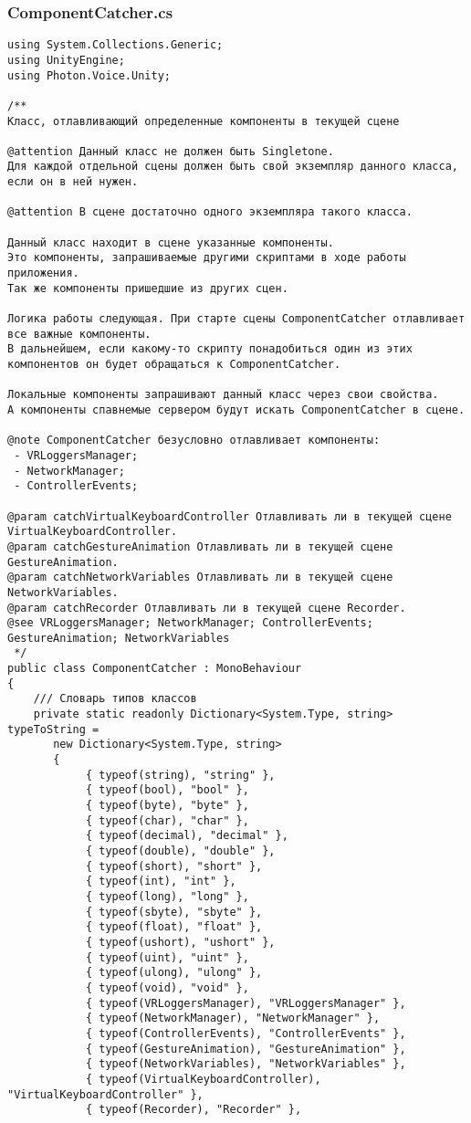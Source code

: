 \subsubsection*{ComponentCatcher.cs}
\begin{verbatim}
﻿using System.Collections.Generic;
using UnityEngine;
using Photon.Voice.Unity;

/**
Класс, отлавливающий определенные компоненты в текущей сцене

@attention Данный класс не должен быть Singletone. 
Для каждой отдельной сцены должен быть свой экземпляр данного класса, если он в ней нужен.

@attention В сцене достаточно одного экземпляра такого класса.

Данный класс находит в сцене указанные компоненты. 
Это компоненты, запрашиваемые другими скриптами в ходе работы приложения. 
Так же компоненты пришедшие из других сцен.

Логика работы следующая. При старте сцены ComponentCatcher отлавливает все важные компоненты. 
В дальнейшем, если какому-то скрипту понадобиться один из этих компонентов он будет обращаться к ComponentCatcher.

Локальные компоненты запрашивают данный класс через свои свойства. 
А компоненты спавнемые сервером будут искать ComponentCatcher в сцене.

@note ComponentCatcher безусловно отлавливает компоненты:
 - VRLoggersManager;
 - NetworkManager;
 - ControllerEvents;

@param catchVirtualKeyboardController Отлавливать ли в текущей сцене VirtualKeyboardController.
@param catchGestureAnimation Отлавливать ли в текущей сцене GestureAnimation.
@param catchNetworkVariables Отлавливать ли в текущей сцене NetworkVariables.
@param catchRecorder Отлавливать ли в текущей сцене Recorder.
@see VRLoggersManager; NetworkManager; ControllerEvents; GestureAnimation; NetworkVariables
 */
public class ComponentCatcher : MonoBehaviour
{
    /// Словарь типов классов
    private static readonly Dictionary<System.Type, string> typeToString =
       new Dictionary<System.Type, string>
       {
            { typeof(string), "string" },
            { typeof(bool), "bool" },
            { typeof(byte), "byte" },
            { typeof(char), "char" },
            { typeof(decimal), "decimal" },
            { typeof(double), "double" },
            { typeof(short), "short" },
            { typeof(int), "int" },
            { typeof(long), "long" },
            { typeof(sbyte), "sbyte" },
            { typeof(float), "float" },
            { typeof(ushort), "ushort" },
            { typeof(uint), "uint" },
            { typeof(ulong), "ulong" },
            { typeof(void), "void" },
            { typeof(VRLoggersManager), "VRLoggersManager" },
            { typeof(NetworkManager), "NetworkManager" },
            { typeof(ControllerEvents), "ControllerEvents" },
            { typeof(GestureAnimation), "GestureAnimation" },
            { typeof(NetworkVariables), "NetworkVariables" },
            { typeof(VirtualKeyboardController), "VirtualKeyboardController" },
            { typeof(Recorder), "Recorder" },


\end{verbatim}
